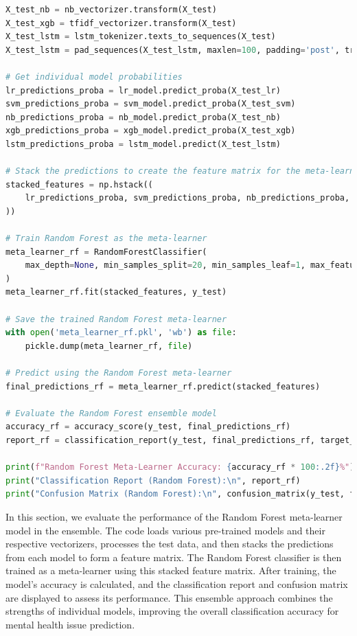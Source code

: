\begin{tcolorbox}[colback=gray!5!white, colframe=gray!80!black, boxrule=0.5pt, title=Evaluate Meta-Learner and Ensemble Model 4]
    \begin{lstlisting}[language=Python]
X_test_nb = nb_vectorizer.transform(X_test)
X_test_xgb = tfidf_vectorizer.transform(X_test)
X_test_lstm = lstm_tokenizer.texts_to_sequences(X_test)
X_test_lstm = pad_sequences(X_test_lstm, maxlen=100, padding='post', truncating='post')

# Get individual model probabilities
lr_predictions_proba = lr_model.predict_proba(X_test_lr)
svm_predictions_proba = svm_model.predict_proba(X_test_svm)
nb_predictions_proba = nb_model.predict_proba(X_test_nb)
xgb_predictions_proba = xgb_model.predict_proba(X_test_xgb)
lstm_predictions_proba = lstm_model.predict(X_test_lstm)

# Stack the predictions to create the feature matrix for the meta-learner
stacked_features = np.hstack((
    lr_predictions_proba, svm_predictions_proba, nb_predictions_proba, xgb_predictions_proba, lstm_predictions_proba
))

# Train Random Forest as the meta-learner
meta_learner_rf = RandomForestClassifier(
    max_depth=None, min_samples_split=20, min_samples_leaf=1, max_features='sqrt', bootstrap=False, random_state=42           
)
meta_learner_rf.fit(stacked_features, y_test)

# Save the trained Random Forest meta-learner
with open('meta_learner_rf.pkl', 'wb') as file:
    pickle.dump(meta_learner_rf, file)

# Predict using the Random Forest meta-learner
final_predictions_rf = meta_learner_rf.predict(stacked_features)

# Evaluate the Random Forest ensemble model
accuracy_rf = accuracy_score(y_test, final_predictions_rf)
report_rf = classification_report(y_test, final_predictions_rf, target_names=label_encoder.classes_)

print(f"Random Forest Meta-Learner Accuracy: {accuracy_rf * 100:.2f}%")
print("Classification Report (Random Forest):\n", report_rf)
print("Confusion Matrix (Random Forest):\n", confusion_matrix(y_test, final_predictions_rf))
    \end{lstlisting}
\end{tcolorbox}

\noindent
In this section, we evaluate the performance of the Random Forest meta-learner model in the ensemble. The code loads various pre-trained models and their respective vectorizers, processes the test data, and then stacks the predictions from each model to form a feature matrix. The Random Forest classifier is then trained as a meta-learner using this stacked feature matrix. After training, the model's accuracy is calculated, and the classification report and confusion matrix are displayed to assess its performance. This ensemble approach combines the strengths of individual models, improving the overall classification accuracy for mental health issue prediction.


